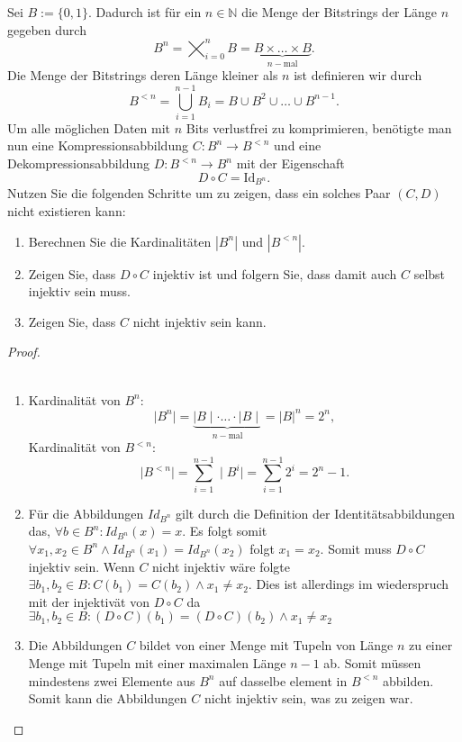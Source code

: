 \documentclass{../problemset}
\begin{document}
\begin{problem}
Sei $B := \{0, 1\}$. Dadurch ist für ein $n \in \mathbb{N}$ die Menge der Bitstrings der Länge $n$ gegeben durch
\[B^n = \bigtimes_{i=0}^{n} B = \underbrace{B \times \ldots \times B}_{n-\text{mal}}.\]
Die Menge der Bitstrings deren Länge kleiner als $n$ ist definieren wir durch
\[B^{<n} = \bigcup_{i=1}^{n-1} B_i = B \cup B^2 \cup \ldots \cup B^{n-1}.\]
Um alle möglichen Daten mit $n$ Bits verlustfrei zu komprimieren, benötigte man nun eine Kompressionsabbildung $C : B^n \rightarrow B^{<n}$ und eine Dekompressionsabbildung $D : B^{<n} \rightarrow B^n$ mit der Eigenschaft
\[D \circ C = \text{Id}_{B^n}.\]
Nutzen Sie die folgenden Schritte um zu zeigen, dass ein solches Paar $(C, D)$ nicht existieren kann:
\begin{enumerate}
	\item Berechnen Sie die Kardinalitäten $|B^n|$ und $|B^{<n}|$.
	\item Zeigen Sie, dass $D \circ C$ injektiv ist und folgern Sie, dass damit auch $C$ selbst injektiv sein muss.
	\item Zeigen Sie, dass $C$ nicht injektiv sein kann.
\end{enumerate}

\begin{proof} \\\
	\begin{enumerate}
		\item Kardinalität von $B^n$: \[
			      \mid B^n \mid = \underbrace{\mid B \mid \cdot \ldots \cdot \mid B \mid }_{n - \text{mal}} = {|B|}^n = 2^n,
		      \]
		      Kardinalität von $B^{<n}$: \[
			      \mid B^{<n} \mid = \sum_{i=1}^{n-1} \mid B^i \mid = \sum_{i=1}^{n-1} 2^i = 2^n - 1.
		      \]
		\item Für die Abbildungen $Id_{B^n}$ gilt durch die Definition der Identitätsabbildungen das, $\forall b \in B^n: Id_{B^n}(x) = x$.
		      Es folgt somit $\forall x_1, x_2 \in B^n \land Id_{B^n}(x_1) = Id_{B^n}(x_2)$ folgt $x_1 = x_2$.
		      Somit muss $D \circ C$ injektiv sein.
		      Wenn $C$ nicht injektiv wäre folgte $\exists b_1, b_2 \in B: C(b_1) = C(b_2) \land x_1 \ne x_2$.
		      Dies ist allerdings im wiederspruch mit der injektivät von $D \circ C$ da $\exists b_1, b_2 \in B: (D \circ C)(b_1) = (D \circ C)(b_2) \land x_1 \ne x_2$
		\item
		      Die Abbildungen $C$ bildet von einer Menge mit Tupeln von Länge $n$ zu einer Menge mit Tupeln mit einer maximalen Länge $n-1$ ab.
		      Somit müssen mindestens zwei Elemente aus $B^n$ auf dasselbe element in $B^{<n}$ abbilden.
		      Somit kann die Abbildungen $C$ nicht injektiv sein, was zu zeigen war. \checkmark
	\end{enumerate}
\end{proof}

\end{problem}
\end{document}

